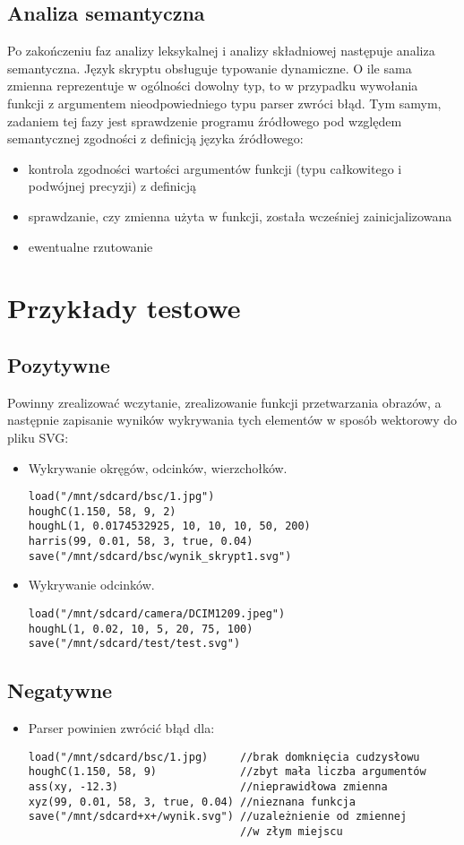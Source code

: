 \documentclass[11pt,a4paper]{article}
\begin{document}
\subsection{Analiza semantyczna}
Po zakończeniu faz analizy leksykalnej i analizy składniowej następuje analiza semantyczna. Język skryptu obsługuje typowanie dynamiczne. O ile sama zmienna reprezentuje w ogólności dowolny typ, to w przypadku wywołania funkcji z argumentem nieodpowiedniego typu parser zwróci błąd. Tym samym, zadaniem tej fazy jest sprawdzenie programu źródłowego pod względem semantycznej zgodności z definicją języka źródłowego:
\begin{itemize}
\item kontrola zgodności wartości argumentów funkcji (typu całkowitego i podwójnej precyzji) z definicją
\item sprawdzanie, czy zmienna użyta w funkcji, została wcześniej zainicjalizowana
\item ewentualne rzutowanie
\end{itemize}
\section{Przykłady testowe}
\subsection{Pozytywne}
Powinny zrealizować wczytanie, zrealizowanie funkcji przetwarzania obrazów, a następnie zapisanie wyników wykrywania tych elementów w sposób wektorowy do pliku SVG:
\begin{itemize}

\item Wykrywanie okręgów, odcinków, wierzchołków.
\begin{verbatim}
load("/mnt/sdcard/bsc/1.jpg")
houghC(1.150, 58, 9, 2)
houghL(1, 0.0174532925, 10, 10, 10, 50, 200)
harris(99, 0.01, 58, 3, true, 0.04)
save("/mnt/sdcard/bsc/wynik_skrypt1.svg")
\end{verbatim}

\item Wykrywanie odcinków.
\begin{verbatim}
load("/mnt/sdcard/camera/DCIM1209.jpeg")
houghL(1, 0.02, 10, 5, 20, 75, 100)
save("/mnt/sdcard/test/test.svg")
\end{verbatim}
\end{itemize}
\subsection{Negatywne}
\begin{itemize}
\item Parser powinien zwrócić błąd dla:

\begin{verbatim}
load("/mnt/sdcard/bsc/1.jpg)     //brak domknięcia cudzysłowu
houghC(1.150, 58, 9)             //zbyt mała liczba argumentów
ass(xy, -12.3)                   //nieprawidłowa zmienna
xyz(99, 0.01, 58, 3, true, 0.04) //nieznana funkcja
save("/mnt/sdcard+x+/wynik.svg") //uzależnienie od zmiennej
                                 //w złym miejscu
\end{verbatim}
\end{itemize}
\end{document}
